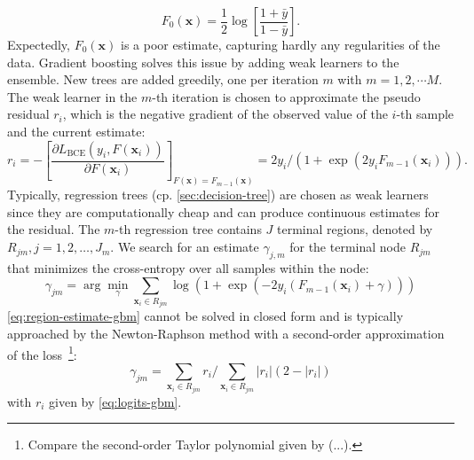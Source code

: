 \begin{equation}
    F_0(\mathbf{x})= \frac{1}{2} \log \left[\frac{1+\bar{y}}{1-\bar{y}}\right].
\end{equation}
Expectedly, $F_0(\mathbf{x})$ is a poor estimate, capturing hardly any regularities of the data. Gradient boosting solves this issue by adding weak learners to the ensemble. New trees are added greedily, one per iteration $m$ with $m=1,2,\cdots M$. The weak learner in the $m$-th iteration is chosen to approximate the pseudo residual $r_i$, which is the negative gradient of the observed value of the $i$-th sample and the current estimate:
\begin{equation}
    r_i=-\left[\frac{\partial L_{\mathrm{BCE}}\left(y_i, F\left(\mathbf{x}_i\right)\right)}{\partial F\left(\mathbf{x}_i\right)}\right]_{F(\mathbf{x})=F_{m-1}(\mathbf{x})}=2 y_i /\left(1+\exp \left(2 y_i F_{m-1}\left(\mathbf{x}_i\right)\right)\right).
\end{equation}
Typically, regression trees (cp. \cref{sec:decision-tree}) are chosen as weak learners since they are computationally cheap and can produce continuous estimates for the residual. The $m$-th regression tree contains $J$ terminal regions, denoted by $R_{j m}, j=1,2, \ldots, J_{m}$. We search for an estimate $\gamma_{j,m}$ for the terminal node $R_{jm}$ that minimizes the cross-entropy over all samples within the node:
\begin{equation}
    \gamma_{j m}=\arg \min _\gamma \sum_{\mathbf{x}_i \in R_{j m}} \log \left(1+\exp \left(-2 y_i\left(F_{m-1}\left(\mathbf{x}_i\right)+\gamma\right)\right)\right)
    \label{eq:region-estimate-gbm}
\end{equation}
\cref{eq:region-estimate-gbm} cannot be solved in closed form and is typically approached by the Newton-Raphson method with a second-order approximation of the loss~\footnote{Compare the second-order Taylor polynomial given by (...).}:
\begin{equation}
    \gamma_{j m}=\sum_{\mathbf{x}_i \in R_{j m}} r_i / \sum_{\mathbf{x}_i \in R_{j m}}\left|r_i\right|\left(2-\left|r_i\right|\right)
\end{equation}
with $r_i$ given by \cref{eq:logits-gbm}.

